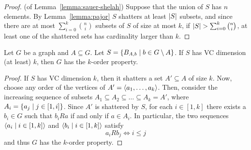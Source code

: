 \begin{lemma}
        \begin{proof} (of Lemma~\ref{lemma:sauer-shelah})
            Suppose that the union of $S$ has $n$ elements.
            By Lemma~\ref{lemma:pajor} $S$ shatters at least $\left| S \right|$ subsets, and since there are at most
            $\sum_{i=0}^k \binom{n}{i}$ subsets of $S$ of size at most $k$, if
            $\left| S \right| > \sum_{i=0}^k \binom{n}{i}$, at least one of the shattered sets has cardinality larger than $k$.
        \end{proof}
    \end{lemma}

    \begin{lemma} \label{lemma:vc_dimension_implies_k_order_property}
        Let $G$ be a graph and $A \subseteq G$.
        Let $S = \left\{ B_{A,b} \mid b \in G \setminus A \right\}$.
        If $S$ has VC dimension (at least) $k$, then $G$ has the $k$-order property.
        \begin{proof}
            If $S$ has VC dimension $k$, then it shatters a set $A' \subseteq A$ of size $k$.
            Now, choose any order of the vertices of $A' = \left< a_1, \dots, a_k \right>$.
            Then, consider the increasing sequence of subsets $A_1 \subseteq A_2 \subseteq \dots \subseteq A_k = A'$,
            where $A_i = \left\{ a_j \mid j \in [1,i] \right\}$.
            Since $A'$ is shattered by $S$, for each $i \in [1,k]$ there exists a $b_i \in G$ such that
            $b_i R a$ if and only if $a \in A_i$.
            In particular, the two sequences $\left< a_i \mid i \in [1,k] \right>$ and $\left< b_i \mid i \in [1,k] \right>$
            satisfy
            \[
                a_i R b_j \Leftrightarrow i \leq j
            \]
            and thus $G$ has the $k$-order property.
        \end{proof}
    \end{lemma}

